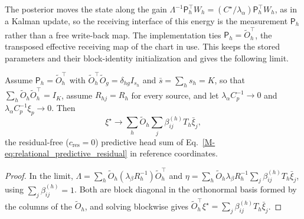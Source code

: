 \documentclass[twoside,11pt]{article}
\begin{document}
The posterior moves the state along the gain $\Lambda^{-1}\mathsf P_h^\top W_h=(C^\star/\lambda_\alpha)\mathsf P_h^\top W_h$, as in a Kalman update, so the receiving interface of this energy is the measurement $\mathsf P_h$ rather than a free write-back map. The implementation ties $\mathsf P_h=\widetilde O_h^\top$, the transposed effective receiving map of the chart in use. This keeps the stored parameters and their block-identity initialization and gives the following limit.

\begin{proposition}
\label{prop:rec_predictive_limit}
Assume $\mathsf P_h=\widetilde O_h^\top$ with $\widetilde O_h^\top\widetilde O_g=\delta_{hg}I_{s_h}$ and $\bar s=\sum_hs_h=K$, so that $\sum_h\widetilde O_h\widetilde O_h^\top=I_K$, assume $R_{hj}=R_h$ for every source, and let $\lambda_\alpha C_p^{-1}\to0$ and $\lambda_\alpha C_p^{-1}\xi_p\to0$. Then
\begin{equation}
\xi^\star\to\sum_h\widetilde O_h\sum_j\beta_{ij}^{(h)}T_h\bar\xi_j,
\label{eq:rec_predictive_limit}
\end{equation}
the residual-free ($c_{\mathrm{res}}=0$) predictive head sum of Eq.~\eqref{M-eq:relational_predictive_residual} in reference coordinates.
\end{proposition}
\begin{proof}
In the limit, $\Lambda=\sum_h\widetilde O_h(\lambda_\beta R_h^{-1})\widetilde O_h^\top$ and $\eta=\sum_h\widetilde O_h\lambda_\beta R_h^{-1}\sum_j\beta_{ij}^{(h)}T_h\bar\xi_j$, using $\sum_j\beta_{ij}^{(h)}=1$. Both are block diagonal in the orthonormal basis formed by the columns of the $\widetilde O_h$, and solving blockwise gives $\widetilde O_h^\top\xi^\star=\sum_j\beta_{ij}^{(h)}T_h\bar\xi_j$.
\end{proof}
\end{document}
